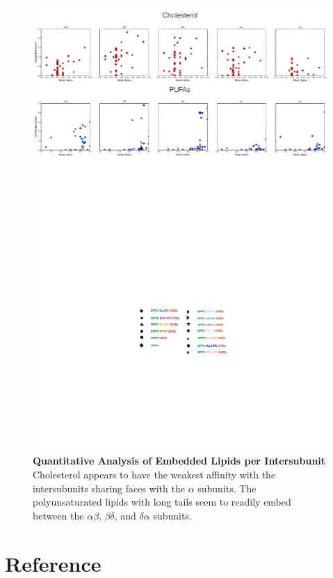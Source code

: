 \documentclass[10pt, letterpaper]{article}
\begin{document}
\begin{figure}[H]
   \centerline{\includegraphics[width=\textwidth,scale=0.55]{Inter.pdf}}
   \centerline{\includegraphics[scale=0.45]{Legend.pdf}}
   
   \caption[Quantitative Analysis of Embedded Lipids per Intersubunit]{\textbf{Quantitative Analysis of Embedded Lipids per Intersubunit} Cholesterol appears to have the weakest affinity with the intersubunits sharing faces with the $\alpha$ subunits. The polyunsaturated lipids with long tails seem to readily embed between the $\alpha\beta$, $\beta\delta$, and $\delta\alpha$ subunits.}\label{fig:inter}
\end{figure}
   \newpage

\section{Reference}
\linespread{1}
\printbibliography
\nocite{*}
\linespread{2}
\newpage
\end{document}
